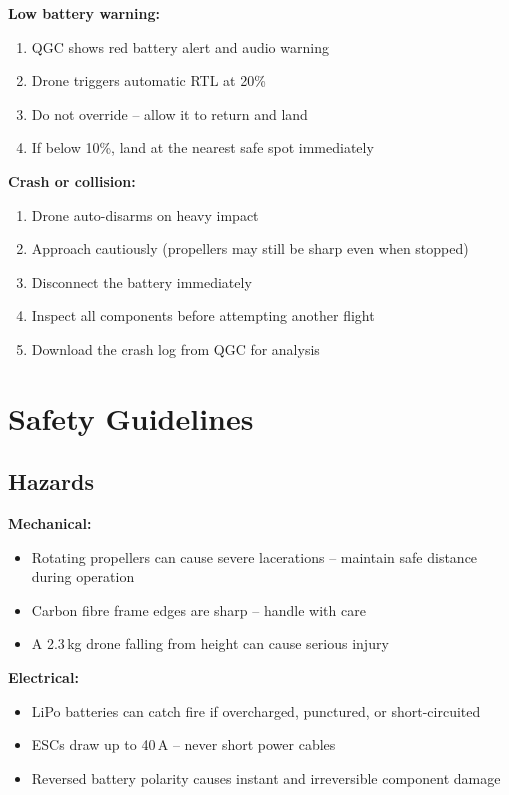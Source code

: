 \documentclass{article}
\begin{document}
\textbf{Low battery warning:}
\begin{enumerate}
    \item QGC shows red battery alert and audio warning
    \item Drone triggers automatic RTL at 20\%
    \item Do not override -- allow it to return and land
    \item If below 10\%, land at the nearest safe spot immediately
\end{enumerate}

\textbf{Crash or collision:}
\begin{enumerate}
    \item Drone auto-disarms on heavy impact
    \item Approach cautiously (propellers may still be sharp even when stopped)
    \item Disconnect the battery immediately
    \item Inspect all components before attempting another flight
    \item Download the crash log from QGC for analysis
\end{enumerate}

\section{Safety Guidelines}

\subsection{Hazards}

\textbf{Mechanical:}
\begin{itemize}
    \item Rotating propellers can cause severe lacerations -- maintain safe distance during operation
    \item Carbon fibre frame edges are sharp -- handle with care
    \item A 2.3\,kg drone falling from height can cause serious injury
\end{itemize}

\textbf{Electrical:}
\begin{itemize}
    \item LiPo batteries can catch fire if overcharged, punctured, or short-circuited
    \item ESCs draw up to 40\,A -- never short power cables
    \item Reversed battery polarity causes instant and irreversible component damage
\end{itemize}
\end{document}
